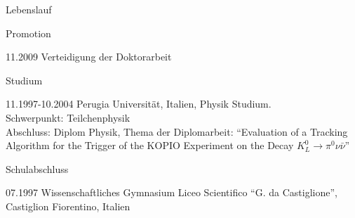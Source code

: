 \documentclass[11pt,a4paper]{scrartcl}
\begin{document}
\begin{cv}{Lebenslauf}
\begin{cvlist}{Promotion}

\item[11.2009] Verteidigung der Doktorarbeit

\end{cvlist}

\begin{cvlist}{Studium}
\item [11.1997-10.2004]Perugia Universit\"at, Italien, Physik
Studium. \\ Schwerpunkt: Teilchenphysik\\ Abschluss: Diplom
Physik, Thema der Diplomarbeit: "`Evaluation of a Tracking
Algorithm for the Trigger of the KOPIO Experiment on the Decay
$K_L^0\rightarrow\pi^0\nu\bar{\nu}$"'\\

% 

\end{cvlist}

\begin{cvlist}{Schulabschluss}
\item[07.1997] Wissenschaftliches Gymnasium Liceo Scientifico "`G. da
Castiglione"', Castiglion Fiorentino, Italien
\end{cvlist}


\end{cv}
\end{document}
